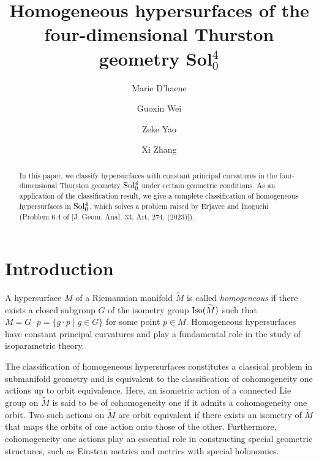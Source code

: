 \documentclass[reqno]{amsart}%
\title[Homogeneous hypersurfaces of Sol${ }^4_0$]
{Homogeneous hypersurfaces of the four-dimensional Thurston geometry Sol${ }^4_0$}
\author{Marie D'haene\and Guoxin Wei\and Zeke Yao\and Xi Zhang}
\theoremstyle{definition}
\numberwithin{equation}{section}
\begin{document}
	
	\begin{abstract}
		In this paper, we classify hypersurfaces with constant principal curvatures in the four-dimensional Thurston geometry ${\rm Sol_0^4}$ under certain geometric conditions. As an application of the classification result, we give a complete classification of homogeneous hypersurfaces in
		${\rm Sol_0^4}$, which solves a problem raised by Erjavec and Inoguchi (Problem 6.4 of [J. Geom. Anal. 33, Art. 274, (2023)]).
	\end{abstract}
	
	\maketitle
	
	
	\section{Introduction}\label{sect:1}
	
	A hypersurface $M$ of a Riemannian manifold $\widetilde{M}$ is called {\it homogeneous}
	if there exists a closed subgroup $G$ of the isometry group ${\rm Iso}(\widetilde{M})$
	such that $M=G \cdot p=\{g\cdot p\mid g\in G\}$ for some point $p\in M$.
	Homogeneous hypersurfaces have constant principal curvatures and
	play a fundamental role in the study of isoparametric theory.
	
	The classification of homogeneous hypersurfaces constitutes a classical problem in submanifold geometry 
	and is equivalent to the classification of cohomogeneity one actions up to orbit equivalence.
	Here, an isometric action of a connected Lie group on
	$\widetilde{M}$ is said to be of cohomogeneity one if it admits a cohomogeneity one orbit.
	Two such actions on $\widetilde{M}$ are orbit equivalent if there exists an isometry of
	$\widetilde{M}$ that maps the orbits of one action onto those of the other.
	Furthermore, cohomogeneity one actions play an essential role in constructing special geometric structures, such as Einstein metrics and metrics with special holonomies.
	
\end{document}
